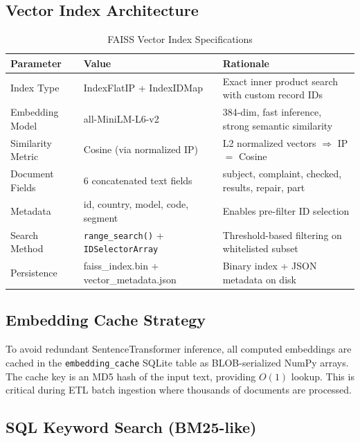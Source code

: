 \documentclass[12pt, a4paper, twoside]{article}
\begin{document}
\subsection{Vector Index Architecture}

\begin{table}[H]
\centering
\caption{FAISS Vector Index Specifications}
\label{tab:faiss}
\begin{tabularx}{\textwidth}{L{2.8cm} L{3.5cm} X}
\toprule
{}\color{white}\textbf{Parameter} & \color{white}\textbf{Value} & \color{white}\textbf{Rationale} \\
\midrule
Index Type & IndexFlatIP + IndexIDMap & Exact inner product search with custom record IDs \\
Embedding Model & all-MiniLM-L6-v2 & 384-dim, fast inference, strong semantic similarity \\
Similarity Metric & Cosine (via normalized IP) & L2 normalized vectors $\Rightarrow$ IP $=$ Cosine \\
Document Fields & 6 concatenated text fields & subject, complaint, checked, results, repair, part \\
Metadata & id, country, model, code, segment & Enables pre-filter ID selection \\
Search Method & \texttt{range\_search()} + \texttt{IDSelectorArray} & Threshold-based filtering on whitelisted subset \\
Persistence & faiss\_index.bin + vector\_metadata.json & Binary index + JSON metadata on disk \\
\bottomrule
\end{tabularx}
\end{table}

\subsection{Embedding Cache Strategy}

To avoid redundant SentenceTransformer inference, all computed embeddings are cached in the \texttt{embedding\_cache} SQLite table as BLOB-serialized NumPy arrays. The cache key is an MD5 hash of the input text, providing $O(1)$ lookup. This is critical during ETL batch ingestion where thousands of documents are processed.

\subsection{SQL Keyword Search (BM25-like)}
\end{document}
